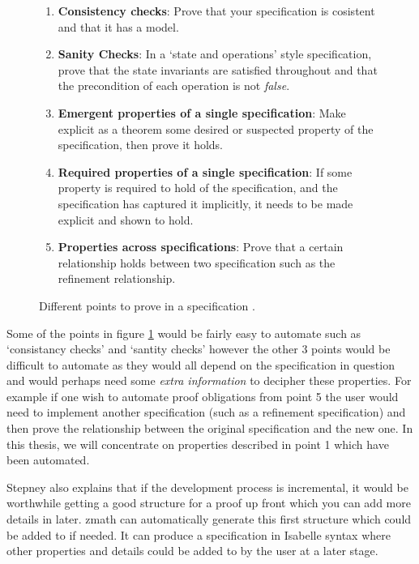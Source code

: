 \begin{figure}[H]
\begin{enumerate}
\item \textbf{Consistency checks}: Prove that your specification is cosistent and that it has a model.

\item \textbf{Sanity Checks}: In a `state and operations' style specification, prove that the state invariants are satisfied throughout and that the precondition of each operation is not \emph{false}.

\item \textbf{Emergent properties of a single specification}: Make explicit as a theorem some desired or suspected property of the specification, then prove it holds.

\item \textbf{Required properties of a single specification}: If some property is required to hold of the specification, and the specification has captured it implicitly, it needs to be made explicit and shown to hold.

\item \textbf{Properties across specifications}: Prove that a certain relationship holds between two specification such as the refinement relationship.
\end{enumerate}
\caption{Different points to prove in a specification \cite{stepney1998tale}. \label{fig:ptp}}
\end{figure}

Some of the points in figure \ref{fig:ptp} would be fairly easy to automate such as `consistancy checks' and `santity checks' however the other 3 points would be difficult to automate as they would all depend on the specification in question and would perhaps need some \emph{extra information} to decipher these properties. For example if one wish to automate proof obligations from point 5 the user would need to implement another specification (such as a refinement specification) and then prove the relationship between the original specification and the new one. In this thesis, we will concentrate on properties described in point 1 which have been automated. 

Stepney also explains that if the development process is incremental, it would be worthwhile getting a good structure for a proof up front which you can add more details in later. \gls{zmath}  can automatically generate this first structure which could be added to if needed. It can produce a specification in Isabelle syntax where other properties and details could be added to by the user at a later stage.

